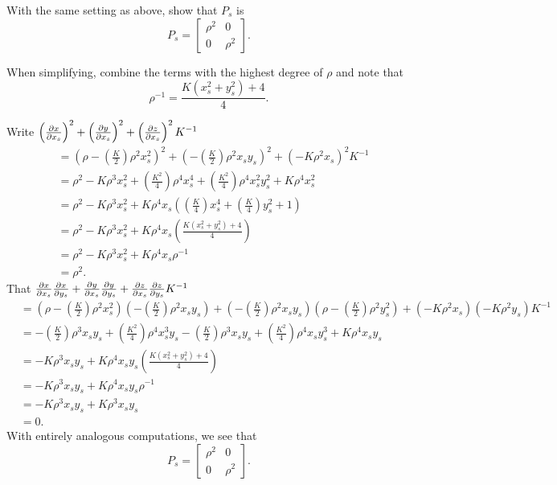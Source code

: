 \documentclass{ximera}
\begin{document}
\begin{problem}
With the same setting as above, show that $P_s$ is
  \[
  P_s =
  \begin{bmatrix}
    \rho^2 & 0\\
    0 & \rho^2
  \end{bmatrix}.
  \]
  \begin{hint}
  When simplifying, combine the terms with the highest degree of $\rho$
  and note that
  \[
  \rho^{-1} = \frac{K\left(x_s^2 + y_s^2\right)+4}{4}.
  \]
\end{hint}
\begin{freeResponse}
  Write $\left(\pp[x]{x_s}\right)^2 + \left(\pp[y]{x_s}\right)^2 +\left(\pp[z]{x_s}\right)^2K^{-1}$
  \begin{align*}
    &=\left(\rho-\left(\frac{K}{2}\right)\rho^2x_s^2\right)^2 + \left(-\left(\frac{K}{2}\right)\rho^2x_sy_s\right)^2 +\left(-K\rho^2x_s\right)^2K^{-1}\\
    &=\rho^2 -K\rho^3x_s^2 + \left(\frac{K^2}{4}\right)\rho^4x_s^4 + \left(\frac{K^2}{4}\right)\rho^4x_s^2y_s^2 + K\rho^4x_s^2\\
    &=\rho^2 -K\rho^3x_s^2 + K\rho^4x_s\left(\left(\frac{K}{4}\right)x_s^4 + \left(\frac{K}{4}\right)y_s^2 + 1\right)\\
    &=\rho^2 -K\rho^3x_s^2 + K\rho^4x_s\left(\frac{K\left(x_s^2+y_s^2\right)+4}{4}\right)\\
    &=\rho^2 -K\rho^3x_s^2 + K\rho^4x_s\rho^{-1}\\
    &=\rho^2.
  \end{align*}
  That $\pp[x]{x_s}\pp[x]{y_s} + \pp[y]{x_s}\pp[y]{y_s} + \pp[z]{x_s}\pp[z]{y_s} K^{-1}$
  \begin{align*}
    &=\left(\rho-\left(\frac{K}{2}\right)\rho^2x_s^2\right)\left(-\left(\frac{K}{2}\right)\rho^2x_sy_s\right)
    + \left(-\left(\frac{K}{2}\right)\rho^2x_sy_s\right)\left(\rho-\left(\frac{K}{2}\right)\rho^2y_s^2\right)
    + \left(-K\rho^2x_s\right)\left(-K\rho^2y_s\right) K^{-1}\\
    &=
    -\left(\frac{K}{2}\right)\rho^3x_sy_s+\left(\frac{K^2}{4}\right)\rho^4x_s^3y_s
    -\left(\frac{K}{2}\right)\rho^3x_sy_s+\left(\frac{K^2}{4}\right)\rho^4x_sy_s^3
    + K\rho^4 x_sy_s\\
    &= -K\rho^3x_sy_s + K\rho^4x_sy_s\left(\frac{K\left(x_s^2+y_s^2\right)+4}{4}\right)\\
    &= -K\rho^3x_sy_s + K\rho^4x_sy_s\rho^{-1}\\
    &= -K\rho^3x_sy_s + K\rho^3x_sy_s\\
    &=0.
  \end{align*}
  With entirely analogous computations, we see that 
    \[
    P_s =
    \begin{bmatrix}
      \rho^2 & 0\\
      0 & \rho^2
    \end{bmatrix}.
    \]
\end{freeResponse}
\end{problem}
\end{document}
